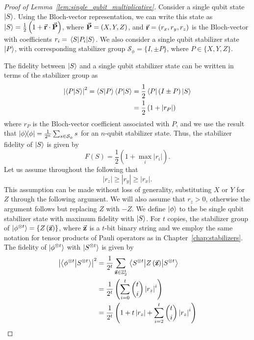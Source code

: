 \begin{proof}[Proof of Lemma~\ref{lem:single_qubit_multiplicative}]

Consider a single qubit state $\ket{S}$. Using the Bloch-vector representation, we can write this state as $\ket{S}=\frac{1}{2}\left(1+\va{r}\cdot\va{P}\right)$, where $\va{P}=\left(X,Y,Z\right)$, and $\va{r}=\left(r_{x},r_{y},r_{z}\right)$ is the Bloch-vector with coefficients $r_{i}=\matrixel{S}{P_{i}}{S}$.
We also consider a single qubit stabilizer state $\ket{P}$, with corresponding stabilizer group $\mathcal{S}_{\phi}=\{I, \pm P\}$, where $P\in \{X, Y, Z\}$.\par
The fidelity between $\ket{S}$ and a single qubit stabilizer state can be written in terms of the stabilizer group as
\begin{align*}
\left|\braket{P}{S}\right|^{2}=\braket{S}{P}\braket{P}{S}&=\frac{1}{2} \bra{P}\left(I \pm P\right)\ket{S}\\
&=\frac{1}{2}\left(1+\left|r_{P}\right|\right)
\end{align*}
where $r_{P}$ is the Bloch-vector coefficient associated with $P$, and we use the result that $\ketbra{\phi}=\frac{1}{2^{n}}\sum_{s\in\mathcal{S}_{\phi}}s$ for an $n$-qubit stabilizer state. Thus, the stabilizer fidelity of $\ket{S}$ is given by 
\[F(S)=\frac{1}{2}\left(1+\max_{i}\left|r_{i}\right|\right).\]
Let us assume throughout the following that 
\[\left|r_{z}\right| \geq \left|r_{y}\right| \geq \left|r_{x}\right|.\]
This assumption can be made without loss of generality, substituting $X$ or $Y$ for $Z$ through the following argument. We will also assume that $r_{z}>0$, otherwise the argument follows but replacing $Z$ with $-Z$. We define $\ket{\phi}$ to the be single qubit stabilizer state with maximum fidelity with $\ket{S}$.
For $t$ copies, the stabilizer group of $\ket{\phi^{\otimes t}}=\{Z\left(\va{z}\right)\}$, where $\va{z}$ is a $t$-bit binary string and we employ the same notation for tensor products of Pauli operators as in Chapter~\ref{chap:stabilizers}. The fidelity of $\ket{\phi^{\otimes t}}$ with $\ket{S^{\otimes t}}$ is given by
\begin{align}
\left|\braket{\phi^{\otimes t}}{S^{\otimes t}}\right|^{2} &= \frac{1}{2^{t}}\sum_{\va{z}\in\mathbb{Z}_{2}^{t}}\matrixel{S^{\otimes t}}{Z\left(\va{z}\right)}{S^{\otimes t}}\nonumber\\
&= \frac{1}{2^{t}}\left(\sum_{i=0}^{t}\binom{t}{i}\left|r_{z}\right|^{i}\right) \nonumber\\&=
\frac{1}{2^{t}} \left( 1+t\left|r_{z}\right| + \sum_{i=2}^{t}\binom{t}{i}\left|r_{z}\right|^{i} \right)

\end{align}
\end{proof}
